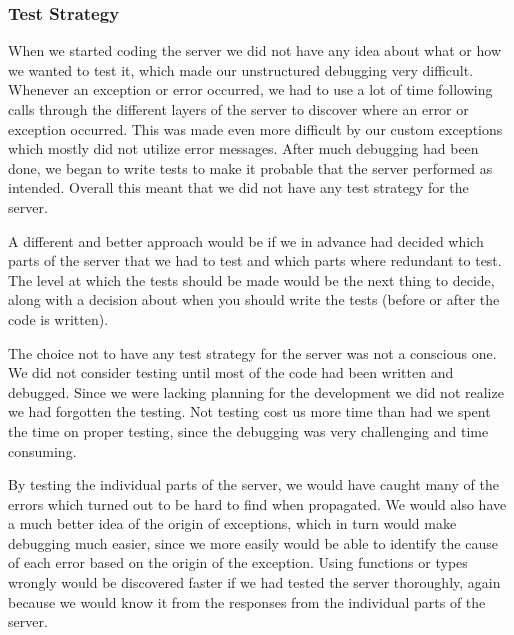 \subsubsection{Test Strategy}
When we started coding the server we did not have any idea about  what or how we wanted to test it, which made our unstructured  debugging very difficult.
Whenever an exception or error occurred, we had to use a lot of time following calls through the different layers of the server to discover where an  error or exception occurred.
This was made even more difficult by our custom exceptions which mostly did not utilize error messages.
After much debugging had been done, we began to write tests to make it probable  that the server performed as intended.
Overall this meant that we did not have any test strategy for the server.

A different and better approach would be  if we in advance had decided which parts of the server that we had to test and which parts where redundant to test.
The level at which the tests should be made would be the next thing to decide, along with a decision about when you should write the tests (before or after the code is written).

The choice not to have any test strategy for the server was not a conscious one.
We did not consider testing until most of the code had been written and debugged.
Since we were lacking planning for the development we did not realize we had forgotten the testing.
Not testing cost us more time than had we spent the time on proper testing, since the debugging was very challenging and time consuming.

By testing the individual parts of the server, we would have caught many of the errors which turned out to be hard to find when propagated.
We would also have a much better idea of the origin of exceptions, which in turn would make debugging much easier, since we more easily would be able to identify the cause of each error based on the origin of the exception.
Using functions or types wrongly would be discovered faster if we had tested the server thoroughly, again because we would know it from the responses from the individual parts of the server.